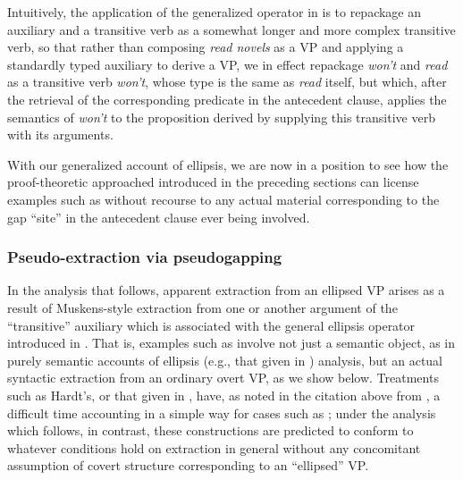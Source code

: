 \documentclass[output=paper,colorlinks,citecolor=brown]{langscibook}
\begin{document}
\noindent Intuitively, the application of the generalized operator in
 is to repackage an auxiliary and a transitive verb as a
somewhat longer and more complex transitive verb, so that rather than
composing \textit{read novels} as a VP and applying a standardly typed
auxiliary to derive a VP, we in effect repackage \textit{won't} and \textit{read} as
a transitive verb \textit{won't}, whose type is the same as \textit{read} itself,
but which, after the retrieval of the corresponding predicate in the
antecedent clause, applies the semantics of \textit{won't} to the proposition
derived by supplying this transitive verb with its arguments.

With our generalized account of ellipsis, we are now in a position to
see how the proof-theoretic approached introduced in the preceding
sections can license examples such as  without
recourse to any actual material corresponding to the gap ``site'' in the
antecedent clause ever being involved.

\subsubsection{Pseudo-extraction via pseudogapping}\label{subsubsec:pseudoextrac}

In the analysis that follows, apparent extraction from an ellipsed VP
arises as a result of Muskens-style extraction from one or another
argument of the ``transitive'' auxiliary which is associated with the
general ellipsis operator introduced in
. That is, examples such as
 involve not just a semantic object, as in purely
semantic accounts of ellipsis (e.g., that given in \citealt{hardt-diss})
analysis, but an actual syntactic extraction from an ordinary overt
VP, as we show below. Treatments such as Hardt's, or that given in
\citet{dalrymple-etal1991}, have, as noted in the citation above from
\citet{Elbourne2008}, a difficult time accounting in a simple way for cases
such as ; under the analysis which follows, in
contrast, these constructions are predicted to conform to whatever
conditions hold on extraction in general without any concomitant
assumption of covert structure corresponding to an ``ellipsed'' VP.
\end{document}

